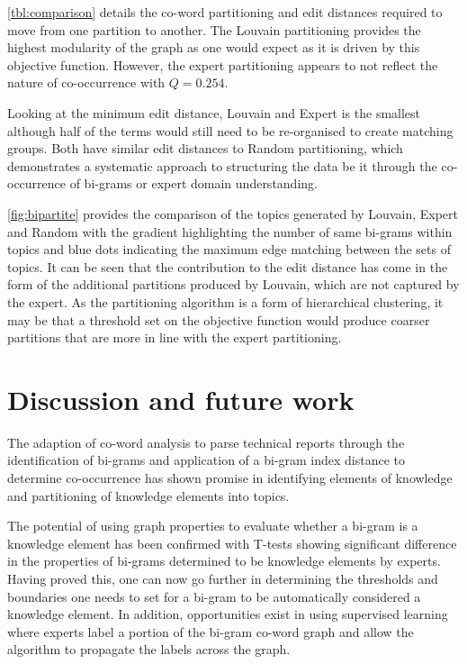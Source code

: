 \documentclass[a4paper, 11pt]{article}
\begin{document}
\cref{tbl:comparison} details the co-word partitioning and edit distances required to move from one partition to another. The Louvain partitioning provides the highest modularity of the graph as one would expect as it is driven by this objective function. However, the expert partitioning appears to not reflect the nature of co-occurrence with $Q=0.254$.

Looking at the minimum edit distance, Louvain and Expert is the smallest although half of the terms would still need to be re-organised to create matching groups. Both have similar edit distances to Random partitioning, which demonstrates a systematic approach to structuring the data be it through the co-occurrence of bi-grams or expert domain understanding.

\cref{fig:bipartite} provides the comparison of the topics generated by Louvain, Expert and Random with the gradient highlighting the number of same bi-grams within topics and blue dots indicating the maximum edge matching between the sets of topics. It can be seen that the contribution to the edit distance has come in the form of the additional partitions produced by Louvain, which are not captured by the expert. As the partitioning algorithm is a form of hierarchical clustering, it may be that a threshold set on the objective function would produce coarser partitions that are more in line with the expert partitioning.

\section{Discussion and future work}\label{sec:dis}

The adaption of co-word analysis to parse technical reports through the identification of bi-grams and application of a bi-gram index distance to determine co-occurrence has shown promise in identifying elements of knowledge and partitioning of knowledge elements into topics.

The potential of using graph properties to evaluate whether a bi-gram is a knowledge element has been confirmed with T-tests showing significant difference in the properties of bi-grams determined to be knowledge elements by experts. Having proved this, one can now go further in determining the thresholds and boundaries one needs to set for a bi-gram to be automatically considered a knowledge element. In addition, opportunities exist in using supervised learning where experts label a portion of the bi-gram co-word graph and allow the algorithm to propagate the labels across the graph.
\end{document}
